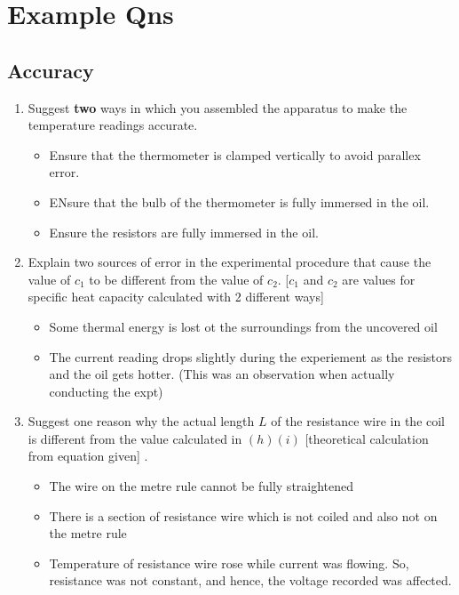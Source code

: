 \documentclass[oneside]{book}
\begin{document}
\chapter{Example Qns}
\endgroup

\section{Accuracy}
\begin{enumerate}
    \item Suggest \textbf{two} ways in which you assembled the apparatus to make the temperature readings accurate.
    \begin{itemize}[label=\(\circ\)]
        \item Ensure that the thermometer is clamped vertically to avoid parallex error.
        \item ENsure that the bulb of the thermometer is fully immersed in the oil.
        \item Ensure the resistors are fully immersed in the oil.
    \end{itemize}
    \item Explain two sources of error in the experimental procedure that cause the value of \(c_1\) to be different from the value of \(c_2\). \scriptsize [\(c_1\) and \(c_2\) are values for specific heat capacity calculated with 2 different ways] \footnotesize
    \begin{itemize}[label=\(\circ\)]
        \item Some thermal energy is lost ot the surroundings from the uncovered oil
        \item The current reading drops slightly during the experiement as the resistors and the oil gets hotter. \scriptsize (This was an observation when actually conducting the expt) \footnotesize
    \end{itemize}
    \item Suggest one reason why the actual length \(L\) of the resistance wire in the coil is different from the value calculated in \((h)(i)\) \scriptsize [theoretical calculation from equation given] \footnotesize. 
    \begin{itemize}[label=\(\circ\)]
        \item The wire on the metre rule cannot be fully straightened
        \item There is a section of resistance wire which is not coiled and also not on the metre rule
        \item Temperature of resistance wire rose while current was flowing. So, resistance was not constant, and hence, the voltage recorded was affected.

\end{itemize}
\end{enumerate}
\end{document}
